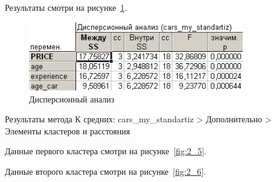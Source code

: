 Результаты смотри на рисунке~\ref{fig:2_4}.

\begin{figure}[!h]
  \centering

  \includegraphics[height=3cm]
  {inc/cars_my/2.4.PNG}

  \caption{Дисперсионный анализ}
  \label{fig:2_4}
\end{figure}

\newpage

Результаты метода К средних: cars\_my\_standartiz > Дополнительно > Элементы кластеров и расстояния

Данные первого кластера смотри на рисунке~\ref{fig:2_5}.

Данные второго кластера смотри на рисунке~\ref{fig:2_6}.

